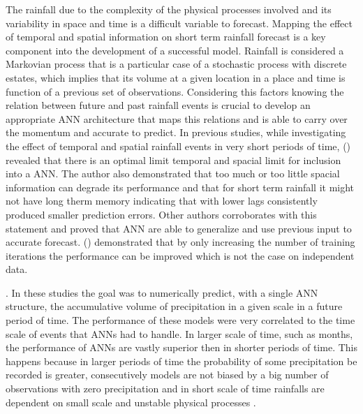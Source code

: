 The rainfall due to the complexity of the physical processes involved and its variability in space and time is a difficult variable to forecast. Mapping the effect of temporal and spatial information on short term rainfall forecast is a key component into the development of a successful model. Rainfall is considered a Markovian process \cite{luk2000study} that  is a particular case of a stochastic process with discrete estates, which implies that its volume at a given location in a place and time is function of a previous set of observations. Considering this factors knowing the relation between future and past rainfall events is crucial to develop an appropriate ANN architecture that maps this relations and is able to carry over the momentum and accurate to predict. In previous studies, while investigating the effect of temporal and spatial rainfall events in very short periods of time, \citeauthor{luk2000study} (\citeyear{luk2000study}) revealed that there is an optimal limit temporal and spacial limit for inclusion into a ANN. The author also demonstrated that too much or too little spacial information can degrade its performance and that for short term rainfall it might not have long therm memory indicating that with lower lags consistently produced smaller prediction errors. Other authors corroborates with this statement and proved that ANN are able to generalize and use previous input to accurate forecast. \citeauthor{french1992rainfall} (\citeyear{french1992rainfall}) demonstrated that by only increasing the number of training iterations the performance can be improved which is not the case on independent data.

\cite{kumarasiri2006rainfall, nasseri2008optimized, ramirez2006linear, luk2000study, french1992rainfall, toth2000comparison, partal2015daily}. In these studies the goal was to numerically predict, with a single ANN structure, the accumulative volume of precipitation in a given scale in a future period of time. The performance of these models were very correlated to the time scale of events that ANNs had to handle. In larger scale of time, such as months, the performance of ANNs are vastly superior then in shorter periods of time. This happens because in larger periods of time the probability of some precipitation be recorded is greater, consecutively models are not biased by a big number of observations with zero precipitation \cite{schoof2001downscaling} and in short scale of time rainfalls are dependent on small scale and unstable physical processes \cite{kuligowski1998localized}.

